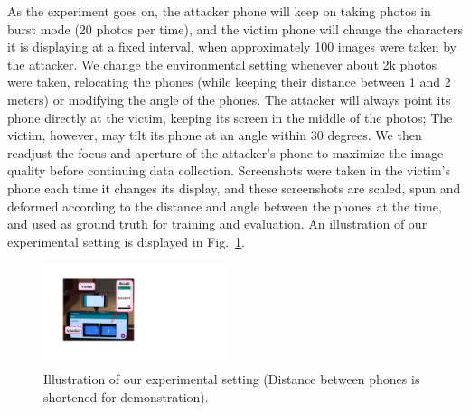 As the experiment goes on, the attacker phone will keep on taking photos in burst mode (20 photos per time), and the victim phone will change the characters it is displaying at a fixed interval, when approximately 100 images were taken by the attacker. We change the environmental setting whenever about 2k photos were taken, relocating the phones (while keeping their distance between 1 and 2 meters) or modifying the angle of the phones. The attacker will always point its phone directly at the victim, keeping its screen in the middle of the photos; The victim, however, may tilt its phone at an angle within 30 degrees. We then readjust the focus and aperture of the attacker's phone to maximize the image quality before continuing data collection. Screenshots were taken in the victim's phone each time it changes its display, and these screenshots are scaled, spun and deformed according to the distance and angle between the phones at the time, and used as ground truth for training and evaluation. An illustration of our experimental setting is displayed in Fig.~\ref{illustration_of_system}.
\begin{figure}
	\centering
	\includegraphics[width=0.48\textwidth]{pic/setup.pdf}
    \caption{Illustration of our experimental setting (Distance between phones is shortened for demonstration).}
	\label{illustration_of_system}
\end{figure}


